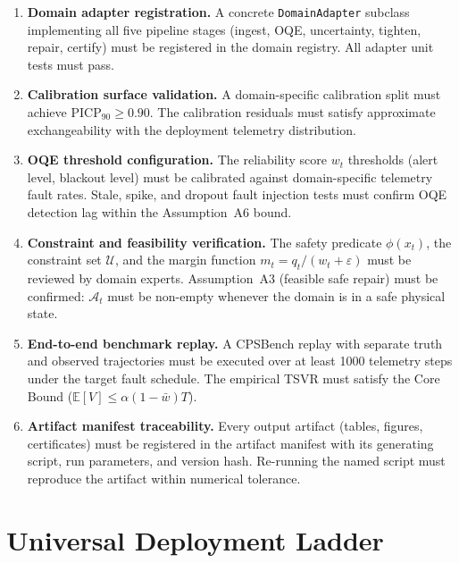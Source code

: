 \begin{enumerate}
  \item \textbf{Domain adapter registration.}  A concrete \texttt{DomainAdapter}
    subclass implementing all five pipeline stages (ingest, OQE, uncertainty,
    tighten, repair, certify) must be registered in the domain registry.
    All adapter unit tests must pass.

  \item \textbf{Calibration surface validation.}  A domain-specific calibration
    split must achieve $\mathrm{PICP}_{90} \ge 0.90$.  The calibration
    residuals must satisfy approximate exchangeability with the deployment
    telemetry distribution.

  \item \textbf{OQE threshold configuration.}  The reliability score $w_t$
    thresholds (alert level, blackout level) must be calibrated against
    domain-specific telemetry fault rates.  Stale, spike, and dropout
    fault injection tests must confirm OQE detection lag within the
    Assumption~A6 bound.

  \item \textbf{Constraint and feasibility verification.}  The safety predicate
    $\phi(x_t)$, the constraint set $\mathcal{U}$, and the margin function
    $m_t = q_t / (w_t + \varepsilon)$ must be reviewed by domain experts.
    Assumption~A3 (feasible safe repair) must be confirmed: $\mathcal{A}_t$
    must be non-empty whenever the domain is in a safe physical state.

  \item \textbf{End-to-end benchmark replay.}  A CPSBench replay with separate
    truth and observed trajectories must be executed over at least 1000
    telemetry steps under the target fault schedule.  The empirical TSVR
    must satisfy the Core Bound ($\mathbb{E}[V] \le \alpha(1-\bar{w})T$).

  \item \textbf{Artifact manifest traceability.}  Every output artifact
    (tables, figures, certificates) must be registered in the artifact
    manifest with its generating script, run parameters, and version hash.
    Re-running the named script must reproduce the artifact within numerical
    tolerance.
\end{enumerate}

\section{Universal Deployment Ladder}

